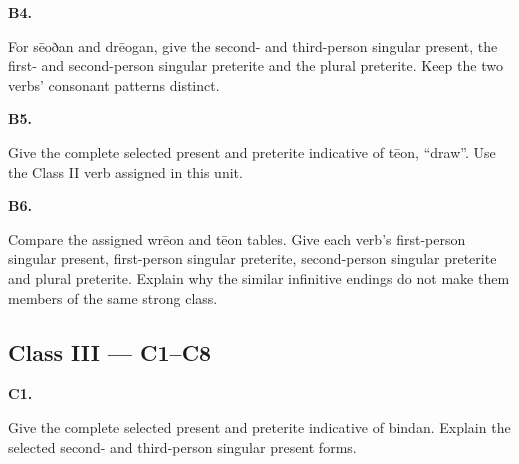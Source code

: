 \par\begin{minipage}{\linewidth}\raggedright
\textbf{B4.}

For sēoðan and drēogan, give the second- and third-person singular present, the first- and second-person singular preterite and the plural preterite. Keep the two verbs’ consonant patterns distinct.

\end{minipage}\par\addvspace{4pt}

\par\begin{minipage}{\linewidth}\raggedright
\textbf{B5.}

Give the complete selected present and preterite indicative of tēon, “draw”. Use the Class II verb assigned in this unit.

\end{minipage}\par\addvspace{4pt}

\par\begin{minipage}{\linewidth}\raggedright
\textbf{B6.}

Compare the assigned wrēon and tēon tables. Give each verb’s first-person singular present, first-person singular preterite, second-person singular preterite and plural preterite. Explain why the similar infinitive endings do not make them members of the same strong class.

\end{minipage}\par\addvspace{4pt}

\subsection*{Class III — C1–C8}

\par\begin{minipage}{\linewidth}\raggedright
\textbf{C1.}

Give the complete selected present and preterite indicative of bindan. Explain the selected second- and third-person singular present forms.

\end{minipage}\par\addvspace{4pt}

